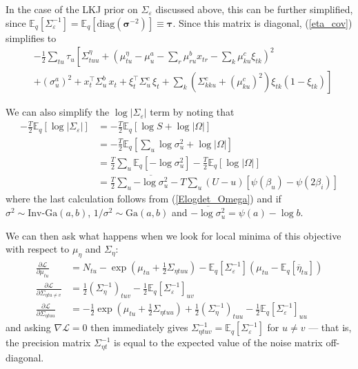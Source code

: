 \documentclass[11pt]{article}
\begin{document}
In the case of the LKJ prior on $\Sigma_\varepsilon$ discussed above, this can be further simplified, since $\mathbb{E}_q[\Sigma_\varepsilon^{-1}] = \mathbb{E}_q[\mathrm{diag}(\boldsymbol{\sigma}^{-2})] \equiv \boldsymbol{\tau}$. Since this matrix is diagonal, (\ref{eta_cov}) simplifies to
\begin{align}
    & -\frac{1}{2} \sum_{tu}\tau_u \left[ \Sigma^\eta_{tuu} +
    \left(\mu^\eta_{tu} - \mu^a_{u} - \sum_r \mu^b_{ru} x_{tr} - \sum_k \mu^c_{ku} \xi_{tk}\right)^2
    \right. \\
    & \left.
    + (\sigma^a_u)^2 + x^\top_t \Sigma^b_u\, x_t +
    \xi^\top_t \Sigma^c_u\, \xi_t +
    \sum_k (\Sigma^c_{kku} + (\mu^c_{ku})^2)\xi_{tk}(1 - \xi_{tk})
    \right]
\end{align}

We can also simplify the $\log |\Sigma_\varepsilon|$ term by noting that
\begin{align}
    -\frac{T}{2}\mathbb{E}_q[\log |\Sigma_\varepsilon|] &=
    -\frac{T}{2}\mathbb{E}_q[\log S + \log |\Omega|] \\
    &= -\frac{T}{2}\mathbb{E}_q[\sum_u \log \sigma^2_u + \log |\Omega|] \\
    &= \frac{T}{2}\sum_u \mathbb{E}_q[-\log \sigma_u^2] - \frac{T}{2}\mathbb{E}_q[\log |\Omega|] \\
    &= \frac{T}{2}\sum_u \overline{-\log \sigma_u^2}  - T\sum_{u} (U - u)[\psi(\beta_u) - \psi(2\beta_i)]
\end{align}
where the last calculation follows from (\ref{Elogdet_Omega}) and if $\sigma^2 \sim \text{Inv-Ga}(a, b)$, $1/\sigma^2 \sim \mathrm{Ga}(a, b)$ and $\overline{-\log \sigma_u^2} = \psi(a) - \log b$.

We can then ask what happens when we look for local minima of this objective with respect to $\mu_\eta$ and $\Sigma_\eta$:
\begin{align}
    \frac{\partial \mathcal{L}}{\partial \mu_{tu}} &=
    N_{tu} - \exp\left(\mu_{tu} + \frac{1}{2} \Sigma_{\eta tuu} \right)
    - \mathbb{E}_q[\Sigma_\varepsilon^{-1}](\mu_{tu} - \mathbb{E}_q[\overline{\eta}_{tu}]) \\
    \frac{\partial \mathcal{L}}{\partial \Sigma_{\eta tu \neq v}} &=
    \frac{1}{2} \left(\Sigma^{-1}_\eta \right)_{tuv}
    -\frac{1}{2}\mathbb{E}_q[\Sigma_\varepsilon^{-1}]_{uv}\\
    \frac{\partial \mathcal{L}}{\partial \Sigma_{\eta tuu}} &=
    -\frac{1}{2} \exp\left(\mu_{tu} + \frac{1}{2} \Sigma_{\eta tuu} \right)
    + \frac{1}{2} \left(\Sigma^{-1}_\eta \right)_{tuu}
    -\frac{1}{2}\mathbb{E}_q[\Sigma_\varepsilon^{-1}]_{uu}
\end{align}
and asking $\nabla \mathcal{L} = 0$ then immediately gives $\Sigma^{-1}_{\eta tuv} = \mathbb{E}_q[\Sigma_\varepsilon^{-1}]$ for $u\neq v$ --- that is, the precision matrix $\Sigma^{-1}_{\eta t}$ is equal to the expected value of the noise matrix off-diagonal.
\end{document}
